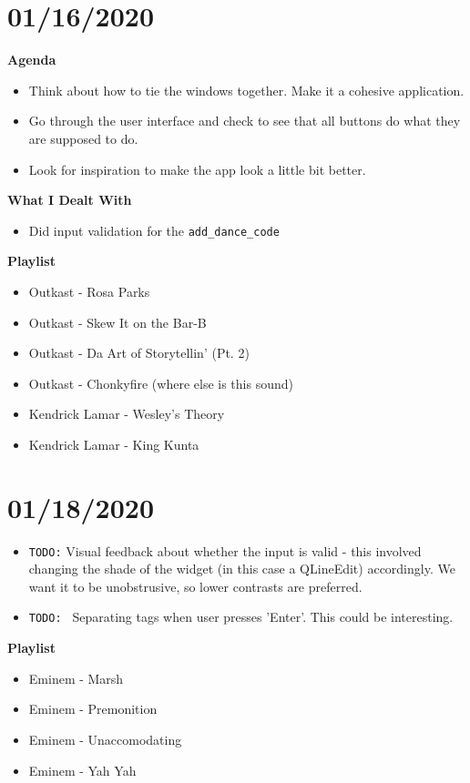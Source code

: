 \documentclass{article}
\begin{document}
\section{01/16/2020}
\textbf{Agenda}
\begin{itemize}
	\item Think about how to tie the windows together. Make it a cohesive application.
	\item Go through the user interface and check to see that all buttons do what they are supposed to do. 
	\item Look for inspiration to make the app look a little bit better. 
\end{itemize}
\textbf{What I Dealt With}
\begin{itemize}
	\item Did input validation for the \texttt{add\_dance\_code}
\end{itemize}
\textbf{Playlist}
\begin{itemize}
	\item Outkast - Rosa Parks
	\item Outkast - Skew It on the Bar-B
	\item Outkast - Da Art of Storytellin' (Pt. 2)
	\item Outkast - Chonkyfire (where else is this sound)
	\item Kendrick Lamar - Wesley's Theory
	\item Kendrick Lamar - King Kunta
\end{itemize}

\section{01/18/2020}
\begin{itemize}
	\item \texttt{TODO:} Visual feedback about whether the input is valid - this involved changing the shade of the widget (in this case a QLineEdit) accordingly. We want it to be unobstrusive, so lower contrasts are preferred.
	\item \texttt{TODO: } Separating tags when user presses 'Enter'. This could be interesting. 
\end{itemize}
\textbf{Playlist}
\begin{itemize}
	\item Eminem - Marsh
	\item Eminem - Premonition
	\item Eminem - Unaccomodating
	\item Eminem - Yah Yah
\end{itemize}
\end{document}
